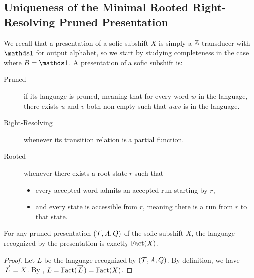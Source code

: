 \subsection{Uniqueness of the Minimal Rooted Right-Resolving Pruned Presentation}\label{app:inf-uniqueness}

We recall that a presentation of a sofic subshift $X$ is simply a ${\mathbb{Z}}$-transducer with $\one$ for output alphabet, so we start by studying completeness in the case where $B = \one$. A presentation of a sofic subshift is:
\begin{description}
	\item[Pruned] if its language is pruned, meaning that for every word $w$ in the language, there exists $u$ and $v$ both non-empty such that $uwv$ is in the language.
	\item[Right-Resolving] whenever its transition relation is a partial function.
	\item[Rooted] whenever there exists a root state $r$ such that
	\begin{itemize}
		\item every accepted word admits an accepted run starting by $r$,
		\item and every state is accessible from $r$, meaning there is a run from $r$ to that state.
	\end{itemize}
\end{description}

\begin{lemma}\label{applem:pruned}
	For any pruned presentation $({\mathcal{T}},A,Q)$ of the sofic subshift $X$, the language recognized by the presentation is exactly $\mathrm{Fact}(X)$.
\end{lemma}
\begin{proof}
	Let $L$ be the language recognized by $({\mathcal{T}},A,Q)$. By definition, we have $\overrightarrow{L} = X$. 
	By , $L = \mathrm{Fact}(\overrightarrow{L}) = \mathrm{Fact}(X)$.
\end{proof}


